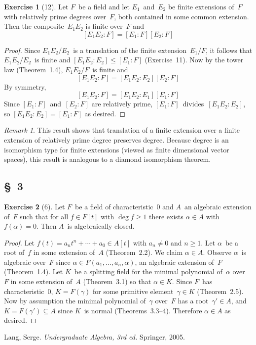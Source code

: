 \documentclass[letterpaper,12pt]{article}
\theoremstyle{definition}
\newtheorem*{exer}{Exercise}
\theoremstyle{remark}
\newtheorem*{rmk}{Remark}
\theoremstyle{direction}
\begin{document}
\begin{exer}[12]
Let \(F\)~be a field and let \(E_1\)~and~\(E_2\) be finite extensions of~\(F\) with relatively prime degrees over~\(F\), both contained in some common extension. Then the composite~\(E_1E_2\) is finite over~\(F\) and
\[[E_1E_2:F]=[E_1:F][E_2:F]\]
\end{exer}
\begin{proof}
Since \(E_1E_2/E_2\)~is a translation of the finite extension~\(E_1/F\), it follows that \(E_1E_2/E_2\)~is finite and \([E_1E_2:E_2]\le[E_1:F]\) (Exercise~11). Now by the tower law (Theorem~1.4), \(E_1E_2/F\)~is finite and
\[[E_1E_2:F]=[E_1E_2:E_2][E_2:F]\]
By symmetry,
\[[E_1E_2:F]=[E_1E_2:E_1][E_1:F]\]
Since \([E_1:F]\)~and~\([E_2:F]\) are relatively prime, \([E_1:F]\)~divides~\([E_1E_2:E_2]\), so \([E_1E_2:E_2]=[E_1:F]\) as desired.
\end{proof}
\begin{rmk}
This result shows that translation of a finite extension over a finite extension of relatively prime degree preserves degree. Because degree is an isomorphism type for finite extensions (viewed as finite dimensional vector spaces), this result is analogous to a diamond isomorphism theorem.
\end{rmk}

\subsection*{\S~3}
\begin{exer}[6]
Let \(F\)~be a field of characteristic~\(0\) and \(A\)~an algebraic extension of~\(F\) such that for all \(f\in F[t]\) with \(\deg f\ge1\) there exists \(\alpha\in A\) with \(f(\alpha)=0\). Then \(A\)~is algebraically closed.
\end{exer}
\begin{proof}
Let \(f(t)=a_nt^n+\cdots+a_0\in A[t]\) with \(a_n\ne0\) and \(n\ge1\). Let \(\alpha\)~be a root of~\(f\) in some extension of~\(A\) (Theorem~2.2). We claim \(\alpha\in A\). Observe \(\alpha\)~is algebraic over~\(F\) since \(\alpha\in F(a_1,\ldots,a_n,\alpha)\), an algebraic extension of~\(F\) (Theorem~1.4). Let \(K\)~be a splitting field for the minimal polynomial of~\(\alpha\) over~\(F\) in some extension of~\(A\) (Theorem~3.1) so that \(\alpha\in K\). Since \(F\)~has characteristic~\(0\), \(K=F(\gamma)\) for some primitive element~\(\gamma\in K\) (Theorem~2.5). Now by assumption the minimal polynomial of~\(\gamma\) over~\(F\) has a root~\(\gamma'\in A\), and \(K=F(\gamma')\subseteq A\) since \(K\)~is normal (Theorems~3.3--4). Therefore \(\alpha\in A\) as desired.
\end{proof}

\begin{thebibliography}{0}
 Lang, Serge. \textit{Undergraduate Algebra, 3rd ed.} Springer, 2005.
\end{thebibliography}
\end{document}
